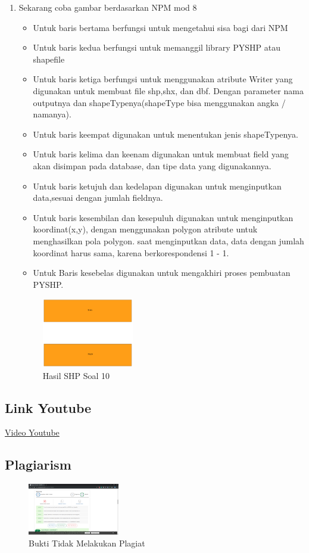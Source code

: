 \begin{enumerate}
	\item Sekarang coba gambar berdasarkan NPM mod 8
	
	\begin{itemize}
		\item Untuk baris bertama berfungsi untuk mengetahui sisa bagi dari NPM
		\item Untuk baris kedua berfungsi untuk memanggil library PYSHP atau shapefile
		\item Untuk baris ketiga berfungsi untuk menggunakan atribute Writer yang digunakan untuk membuat file shp,shx, dan dbf. \hfill\break Dengan parameter nama outputnya dan shapeTypenya(shapeType bisa menggunakan angka / namanya).
		\item Untuk baris keempat digunakan untuk menentukan jenis shapeTypenya.
		\item Untuk baris kelima dan keenam digunakan untuk membuat field yang akan disimpan pada database, dan tipe data yang digunakannya.
		\item Untuk baris ketujuh dan kedelapan digunakan untuk menginputkan data,sesuai dengan jumlah fieldnya.
		\item Untuk baris kesembilan dan kesepuluh digunakan untuk menginputkan koordinat(x,y), dengan menggunakan polygon atribute untuk menghasilkan pola polygon. \hfill\break
		saat menginputkan data, data dengan jumlah koordinat harus sama, karena berkorespondensi 1 - 1.
		\item Untuk Baris kesebelas digunakan untuk mengakhiri proses pembuatan PYSHP.
	\end{itemize}
	\hfill\break
	\begin{figure}[H]
		\includegraphics[width=4cm]{figures/1174027/2/soal10.png}
		\centering
		\caption{Hasil SHP Soal 10}
	\end{figure}
\end{enumerate}
\subsection{Link Youtube}
\href{https://youtu.be/Apvppjotft8}{Video Youtube}
\subsection{Plagiarism}
\begin{figure}[H]
	\includegraphics[width=4cm]{figures/1174027/2/bukti_Unique.png}
	\centering
	\caption{Bukti Tidak Melakukan Plagiat}
\end{figure}